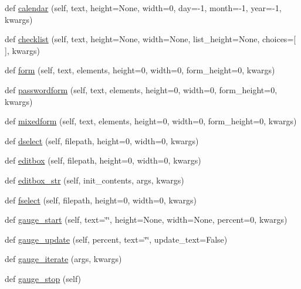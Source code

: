 \begin{DoxyCompactItemize}
\item 
def \hyperlink{class_libraries_1_1dialog_1_1_dialog_afcc42907189b9ec31f9c5665892a8a96}{calendar} (self, text, height=None, width=0, day=-\/1, month=-\/1, year=-\/1, kwargs)
\item 
def \hyperlink{class_libraries_1_1dialog_1_1_dialog_ae9fc7d70f2b3bfb1f1e5297d1c3cfbde}{checklist} (self, text, height=None, width=None, list\+\_\+height=None, choices=\mbox{[}$\,$\mbox{]}, kwargs)
\item 
def \hyperlink{class_libraries_1_1dialog_1_1_dialog_ac2ded5b77c522dd9d3595354ae0fc885}{form} (self, text, elements, height=0, width=0, form\+\_\+height=0, kwargs)
\item 
def \hyperlink{class_libraries_1_1dialog_1_1_dialog_abdabd0bac03838e030372af72af90420}{passwordform} (self, text, elements, height=0, width=0, form\+\_\+height=0, kwargs)
\item 
def \hyperlink{class_libraries_1_1dialog_1_1_dialog_aeddcb812be071cf1a281a08622abdc17}{mixedform} (self, text, elements, height=0, width=0, form\+\_\+height=0, kwargs)
\item 
def \hyperlink{class_libraries_1_1dialog_1_1_dialog_a8e4e29ea1cb20b606bbdaac3bfde646f}{dselect} (self, filepath, height=0, width=0, kwargs)
\item 
def \hyperlink{class_libraries_1_1dialog_1_1_dialog_a2ea657f08bc1f25c65ff86ed279721de}{editbox} (self, filepath, height=0, width=0, kwargs)
\item 
def \hyperlink{class_libraries_1_1dialog_1_1_dialog_a532af6e09796f8f40bb9869ce85038c3}{editbox\+\_\+str} (self, init\+\_\+contents, args, kwargs)
\item 
def \hyperlink{class_libraries_1_1dialog_1_1_dialog_a7470c56c8f59497cef728f2ef0867e5b}{fselect} (self, filepath, height=0, width=0, kwargs)
\item 
def \hyperlink{class_libraries_1_1dialog_1_1_dialog_a421a684f0b8901ab24f74bc977633936}{gauge\+\_\+start} (self, text=\char`\"{}\char`\"{}, height=None, width=None, percent=0, kwargs)
\item 
def \hyperlink{class_libraries_1_1dialog_1_1_dialog_ac620a00caf9512476ba9b9f1aacd2277}{gauge\+\_\+update} (self, percent, text=\char`\"{}\char`\"{}, update\+\_\+text=False)
\item 
def \hyperlink{class_libraries_1_1dialog_1_1_dialog_ac338ba2d0d0c12e1f0e4d25334966c65}{gauge\+\_\+iterate} (args, kwargs)
\item 
def \hyperlink{class_libraries_1_1dialog_1_1_dialog_af919bb2367354d1c955eefd9c67055e2}{gauge\+\_\+stop} (self)

\end{DoxyCompactItemize}

